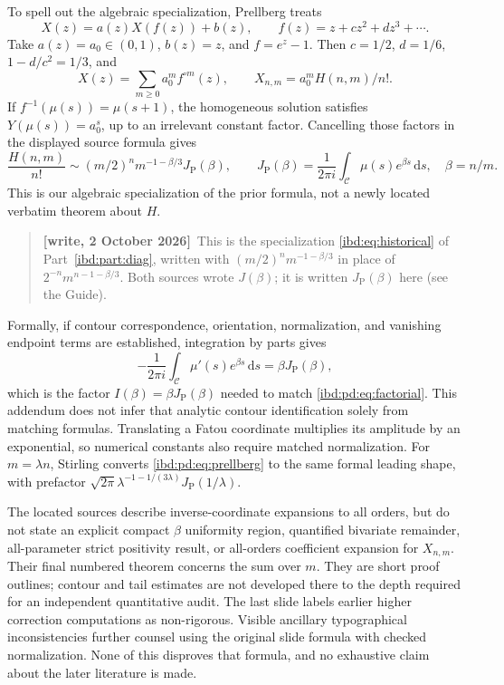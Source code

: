 \documentclass[11pt,letterpaper]{article}
\theoremstyle{remark}\newtheorem{remark}[theorem]{Remark}
\newcommand{\dd}{\,\mathrm d}
\newcommand{\JP}{J_{\mathrm P}}
\newenvironment{writenote}{\par\smallskip\begin{quote}\small\textbf{[write, 2 October 2026]}\ }{\end{quote}\smallskip}
\begin{document}
To spell out the algebraic specialization, Prellberg treats
\[
 X(z)=a(z)X(f(z))+b(z),\qquad f(z)=z+cz^2+dz^3+\cdots.
\]
Take $a(z)=a_0\in(0,1)$, $b(z)=z$, and $f=e^z-1$. Then $c=1/2$, $d=1/6$, $1-d/c^2=1/3$, and
\[
 X(z)=\sum_{m\geq0}a_0^mf^{\circ m}(z),\qquad
 X_{n,m}=a_0^mH(n,m)/n!.
\]
If $f^{-1}(\mu(s))=\mu(s+1)$, the homogeneous solution satisfies $Y(\mu(s))=a_0^s$, up to an irrelevant constant factor. Cancelling those factors in the displayed source formula gives
\begin{equation}\label{ibd:pd:eq:prellberg}
 \frac{H(n,m)}{n!}\sim(m/2)^n m^{-1-\beta/3}\JP(\beta),\qquad
 \JP(\beta)=\frac1{2\pi i}\int_{\mathcal C}\mu(s)e^{\beta s}\dd s,
 \quad\beta=n/m.
\end{equation}
This is our algebraic specialization of the prior formula, not a newly located verbatim theorem about $H$.
\begin{writenote}This is the specialization \eqref{ibd:eq:historical} of Part~\ref{ibd:part:diag}, written with $(m/2)^nm^{-1-\beta/3}$ in place of $2^{-n}m^{n-1-\beta/3}$. Both sources wrote $J(\beta)$; it is written $\JP(\beta)$ here (see the Guide).\end{writenote}

Formally, if contour correspondence, orientation, normalization, and vanishing endpoint terms are established, integration by parts gives
\[
 -\frac1{2\pi i}\int_{\mathcal C}\mu'(s)e^{\beta s}\dd s
 =\beta \JP(\beta),
\]
which is the factor $I(\beta)=\beta \JP(\beta)$ needed to match \eqref{ibd:pd:eq:factorial}. This addendum does not infer that analytic contour identification solely from matching formulas. Translating a Fatou coordinate multiplies its amplitude by an exponential, so numerical constants also require matched normalization. For $m=\lambda n$, Stirling converts \eqref{ibd:pd:eq:prellberg} to the same formal leading shape, with prefactor
$\sqrt{2\pi}\lambda^{-1-1/(3\lambda)}\JP(1/\lambda)$.

The located sources describe inverse-coordinate expansions to all orders, but do not state an explicit compact $\beta$ uniformity region, quantified bivariate remainder, all-parameter strict positivity result, or all-orders coefficient expansion for $X_{n,m}$. Their final numbered theorem concerns the sum over $m$. They are short proof outlines; contour and tail estimates are not developed there to the depth required for an independent quantitative audit. The last slide labels earlier higher correction computations as non-rigorous. Visible ancillary typographical inconsistencies further counsel using the original slide formula with checked normalization. None of this disproves that formula, and no exhaustive claim about the later literature is made.
\end{document}
